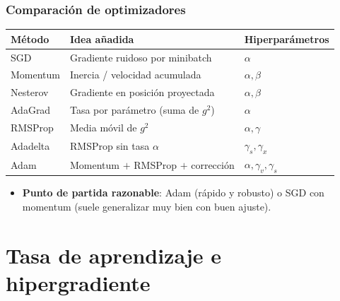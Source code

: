 \documentclass[aspectratio=169, 10pt]{beamer}
\begin{document}
\begin{frame}
\frametitle{Comparaci\'on de optimizadores}
\begin{center}
\begin{tabular}{lll}
\toprule
\textbf{M\'etodo} & \textbf{Idea a\~nadida} & \textbf{Hiperpar\'ametros}\\
\midrule
SGD              & Gradiente ruidoso por minibatch & $\alpha$\\
Momentum         & Inercia / velocidad acumulada   & $\alpha,\beta$\\
Nesterov         & Gradiente en posici\'on proyectada & $\alpha,\beta$\\
AdaGrad          & Tasa por par\'ametro (suma de $g^2$) & $\alpha$\\
RMSProp          & Media m\'ovil de $g^2$           & $\alpha,\gamma$\\
Adadelta         & RMSProp sin tasa $\alpha$        & $\gamma_s,\gamma_x$\\
Adam             & Momentum $+$ RMSProp $+$ correcci\'on & $\alpha,\gamma_v,\gamma_s$\\
\bottomrule
\end{tabular}
\end{center}
\vspace{0.8em}
\begin{itemize}
	\item \textbf{Punto de partida razonable}: Adam (r\'apido y robusto) o SGD con momentum (suele generalizar muy bien con buen ajuste).
\end{itemize}
\end{frame}

\section{Tasa de aprendizaje e hipergradiente}
\end{document}
